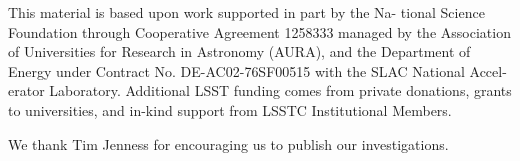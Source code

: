 \documentclass[11pt,twoside]{article}
\begin{document}
\acknowledgements This material is based upon work supported in part by the Na- tional Science Foundation through Cooperative Agreement 1258333 managed by the Association of Universities for Research in Astronomy (AURA), and the Department of Energy under Contract No. DE-AC02-76SF00515 with the SLAC National Accel- erator Laboratory. Additional LSST funding comes from private donations, grants to universities, and in-kind support from LSSTC Institutional Members.

We thank Tim Jenness for encouraging us to publish our investigations.

\end{document}
